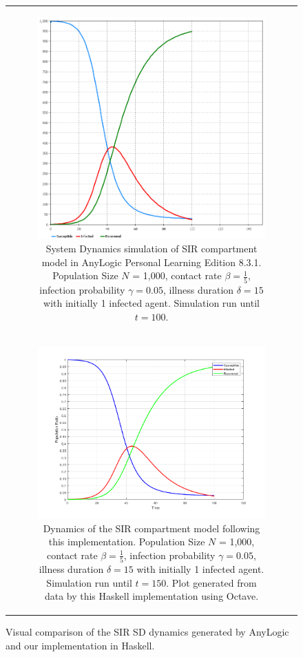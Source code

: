 \begin{figure}
\begin{center}
	\begin{tabular}{c}
		\begin{subfigure}[b]{1.0\textwidth}
			\centering
			\includegraphics[width=.6\textwidth, angle=0]{./fig/appendix/sdsimulation/SIR_SD_1000agents_100t_ANYLOGIC.png}
			\caption{System Dynamics simulation of SIR compartment model in AnyLogic Personal Learning Edition 8.3.1. Population Size $N$ = 1,000, contact rate $\beta = \frac{1}{5}$, infection probability $\gamma = 0.05$, illness duration $\delta = 15$ with initially 1 infected agent. Simulation run until $t = 100$.}
	\label{fig:sir_sd_anylogic}
		\end{subfigure}
		
		\\
    	
		\begin{subfigure}[b]{1.0\textwidth}
			\centering
			\includegraphics[width=.7\textwidth, angle=0]{./fig/appendix/sdsimulation/SIR_SD_1000agents_100t_0001dt.png}
			\caption{Dynamics of the SIR compartment model following this implementation. Population Size $N$ = 1,000, contact rate $\beta =  \frac{1}{5}$, infection probability $\gamma = 0.05$, illness duration $\delta = 15$ with initially 1 infected agent. Simulation run until $t = 150$. Plot generated from data by this Haskell implementation using Octave.}
			\label{fig:sir_sd_haskell_dynamics}
		\end{subfigure}
	\end{tabular}
	
	\caption{Visual comparison of the SIR SD dynamics generated by AnyLogic and our implementation in Haskell.} 
	\label{fig:sir_sd_haskell_vs_anylogic}
\end{center}
\end{figure}

